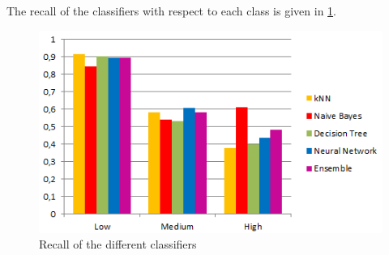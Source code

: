 \noindent The recall of the classifiers with respect to each class is given in
\ref{fig:recall}.

\begin{figure}[H]
	\centering
	\includegraphics[width=\columnwidth]{../../charts/recall.png}
	\caption{Recall of the different classifiers}
	\label{fig:recall}
\end{figure}




